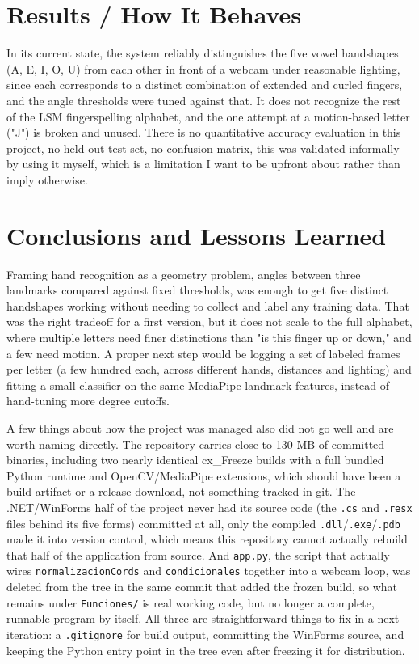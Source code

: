 \documentclass[11pt]{article}
\begin{document}
\section{Results / How It Behaves}

In its current state, the system reliably distinguishes the five vowel handshapes (A, E, I, O, U) from each other in front of a webcam under reasonable lighting, since each corresponds to a distinct combination of extended and curled fingers, and the angle thresholds were tuned against that. It does not recognize the rest of the LSM fingerspelling alphabet, and the one attempt at a motion-based letter ("J") is broken and unused. There is no quantitative accuracy evaluation in this project, no held-out test set, no confusion matrix, this was validated informally by using it myself, which is a limitation I want to be upfront about rather than imply otherwise.

\section{Conclusions and Lessons Learned}
\label{sec:limitations}

Framing hand recognition as a geometry problem, angles between three landmarks compared against fixed thresholds, was enough to get five distinct handshapes working without needing to collect and label any training data. That was the right tradeoff for a first version, but it does not scale to the full alphabet, where multiple letters need finer distinctions than "is this finger up or down," and a few need motion. A proper next step would be logging a set of labeled frames per letter (a few hundred each, across different hands, distances and lighting) and fitting a small classifier on the same MediaPipe landmark features, instead of hand-tuning more degree cutoffs.

A few things about how the project was managed also did not go well and are worth naming directly. The repository carries close to 130 MB of committed binaries, including two nearly identical cx\_Freeze builds with a full bundled Python runtime and OpenCV/MediaPipe extensions, which should have been a build artifact or a release download, not something tracked in git. The .NET/WinForms half of the project never had its source code (the \texttt{.cs} and \texttt{.resx} files behind its five forms) committed at all, only the compiled \texttt{.dll}/\texttt{.exe}/\texttt{.pdb} made it into version control, which means this repository cannot actually rebuild that half of the application from source. And \texttt{app.py}, the script that actually wires \texttt{normalizacionCords} and \texttt{condicionales} together into a webcam loop, was deleted from the tree in the same commit that added the frozen build, so what remains under \texttt{Funciones/} is real working code, but no longer a complete, runnable program by itself. All three are straightforward things to fix in a next iteration: a \texttt{.gitignore} for build output, committing the WinForms source, and keeping the Python entry point in the tree even after freezing it for distribution.
\end{document}
